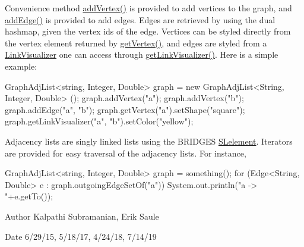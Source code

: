Convenience method \hyperlink{classbridges_1_1base_1_1_graph_adj_list_aca59a3c40af4ae82716ebbfa1751f267}{add\+Vertex()} is provided to add vertices to the graph, and \hyperlink{classbridges_1_1base_1_1_graph_adj_list_a43041976184920e1db1dbe3ad696c6cd}{add\+Edge()} is provided to add edges. Edges are retrieved by using the dual hashmap, given the vertex ids of the edge. Vertices can be styled directly from the vertex element returned by \hyperlink{classbridges_1_1base_1_1_graph_adj_list_aa19cd300a85b05352bdf58720310a112}{get\+Vertex()}, and edges are styled from a \hyperlink{classbridges_1_1base_1_1_link_visualizer}{Link\+Visualizer} one can access through \hyperlink{classbridges_1_1base_1_1_graph_adj_list_af93888dbd2a768a2401619ad5dc95560}{get\+Link\+Visualizer()}. Here is a simple example\+:


\begin{DoxyCode}
GraphAdjList<string, Integer, Double> graph = \textcolor{keyword}{new} GraphAdjList<String, Integer, Double> ();
graph.addVertex(\textcolor{stringliteral}{"a"});
graph.addVertex(\textcolor{stringliteral}{"b"});
graph.addEdge(\textcolor{stringliteral}{"a"}, \textcolor{stringliteral}{"b"});
graph.getVertex(\textcolor{stringliteral}{"a"}).setShape(\textcolor{stringliteral}{"square"});
graph.getLinkVisualizer(\textcolor{stringliteral}{"a"}, \textcolor{stringliteral}{"b"}).setColor(\textcolor{stringliteral}{"yellow"});
\end{DoxyCode}


Adjacency lists are singly linked lists using the B\+R\+I\+D\+G\+ES \hyperlink{classbridges_1_1base_1_1_s_lelement}{S\+Lelement}. Iterators are provided for easy traversal of the adjacency lists. For instance,


\begin{DoxyCode}
GraphAdjList<string, Integer, Double> graph = something();
\textcolor{keywordflow}{for} (Edge<String, Double> e : graph.outgoingEdgeSetOf(\textcolor{stringliteral}{"a"}))
  System.out.println(\textcolor{stringliteral}{"a -> "}+e.getTo());
\end{DoxyCode}


\begin{DoxyAuthor}{Author}
Kalpathi Subramanian, Erik Saule
\end{DoxyAuthor}
\begin{DoxyDate}{Date}
6/29/15, 5/18/17, 4/24/18, 7/14/19
\end{DoxyDate}

